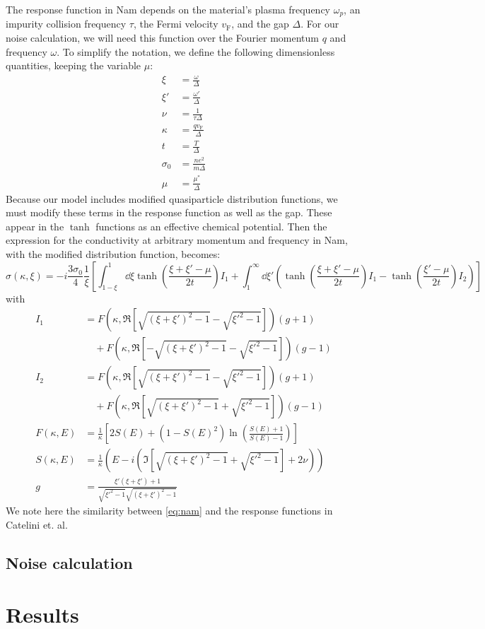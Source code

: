 \documentclass{article}
\newcommand{\vf}{v_{\mathrm{F}}}
\newcommand{\corr}{\mu^{\ast}}
\begin{document}
The response function in Nam depends on the material's plasma frequency $\omega_p$, an impurity collision frequency $\tau$, the Fermi velocity $\vf$, and the gap $\Delta$.
For our noise calculation, we will need this function over the Fourier momentum $q$ and frequency $\omega$.
To simplify the notation, we define the following dimensionless quantities, keeping the variable $\mu$:
\begin{align}
	\xi &= \frac{\omega}{\Delta} \\
	\xi' &= \frac{\omega'}{\Delta} \\
	\nu &= \frac{1}{\tau \Delta} \\
	\kappa &= \frac{q \vf}{\Delta} \\
	t &= \frac{T}{\Delta} \\
	\sigma_0 &= \frac{n e^2}{m \Delta} \\
	\mu &= \frac{\corr}{\Delta}
\end{align}
Because our model includes modified quasiparticle distribution functions, we must modify these terms in the response function as well as the gap.
These appear in the $\tanh$ functions as an effective chemical potential.
Then the expression for the conductivity at arbitrary momentum and frequency in Nam\cite{Nam1967}, with the modified distribution function, becomes:
\begin{equation}
	\sigma(\kappa, \xi) = -i \frac{3 \sigma_0}{4} \frac{1}{\xi}\left[\int_{1 - \xi}^{1}\dd{\xi} \tanh(\frac{\xi + \xi' - \mu}{2 t}) I_1 + \int_{1}^{\infty} \dd{\xi'} \left( \tanh(\frac{\xi + \xi' - \mu}{2t}) I_1  - \tanh(\frac{\xi' - \mu}{2t})I_2 \right) \right] \label{eq:nam}
\end{equation}
with
\begin{align}
	I_1 &= F(\kappa, \Re[\sqrt{(\xi + \xi')^2 - 1} - \sqrt{\xi'^2 - 1}]) (g + 1) \nonumber\\
	&\quad + F(\kappa, \Re[-\sqrt{(\xi + \xi')^2 - 1} - \sqrt{\xi'^2 - 1}]) (g - 1) \\
	I_2 &= F(\kappa, \Re[\sqrt{(\xi + \xi')^2 - 1} - \sqrt{\xi'^2 - 1}]) (g + 1) \nonumber\\
	&\quad + F(\kappa, \Re[\sqrt{(\xi + \xi')^2 - 1} + \sqrt{\xi'^2 - 1}]) (g - 1) \\
	F(\kappa, E) &= \frac{1}{\kappa} \left[2 S(E) + (1 - S(E)^2)\ln(\frac{S(E) + 1}{S(E) - 1})\right]  \\
	S(\kappa, E) &= \frac{1}{\kappa} \left(E - i \left(\Im[\sqrt{(\xi + \xi')^2 - 1} + \sqrt{\xi'^2 - 1}] + 2 \nu \right) \right) \\
	g  &= \frac{\xi' \left( \xi + \xi'\right) + 1}{\sqrt{\xi'^2 - 1}\sqrt{(\xi + \xi')^2 - 1}}
\end{align}
We note here the similarity between \eqref{eq:nam} and the response functions in Catelini et. al\cite{Catelani2010}.

\subsection{Noise calculation}

\section{Results}

\printbibliography
\listoftodos
\end{document}
